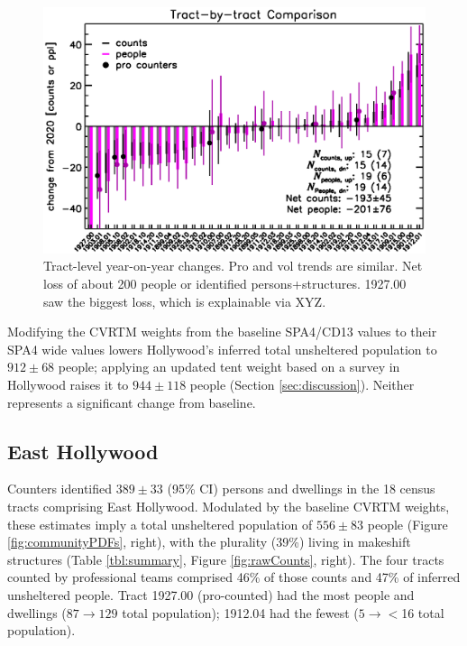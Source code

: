 \documentclass[11pt,twocolumn]{article}
\begin{document}
\begin{figure}[]
	\centering
	\includegraphics[width = 0.8\linewidth, trim = 0cm 0cm 0cm 0cm]{tractsYrYr}
	\caption{Tract-level year-on-year changes. Pro and vol trends are similar. Net loss of
			about 200 people or identified persons+structures. 1927.00 saw the biggest
			loss, which is explainable via XYZ.}
	\label{fig:tractYrYr}
\end{figure}

Modifying the CVRTM weights from the baseline SPA4/CD13 values to their SPA4 wide values 
lowers Hollywood's inferred total unsheltered population to $912\pm68$ people; applying
an updated tent weight based on a survey in Hollywood raises it to $944\pm118$ people (Section
\ref{sec:discussion}). Neither represents a significant change from baseline.

\subsection{East Hollywood}
\label{sec:eHo}

Counters identified $389\pm33$ (95\% CI) persons and dwellings in the 18 census tracts 
comprising East Hollywood. Modulated by the baseline CVRTM weights, these estimates imply 
a total unsheltered population of $556\pm83$ people (Figure \ref{fig:communityPDFs},
right), with the plurality (39\%) living in makeshift structures (Table \ref{tbl:summary}, 
Figure \ref{fig:rawCounts}, right). The four tracts counted by professional teams comprised 46\% of 
those counts and 47\% of inferred unsheltered people. Tract 1927.00 (pro-counted) had the 
most people and dwellings ($87\rightarrow129$ total population); 1912.04 had the fewest 
($5\rightarrow$$<$16 total population). 
\end{document}
